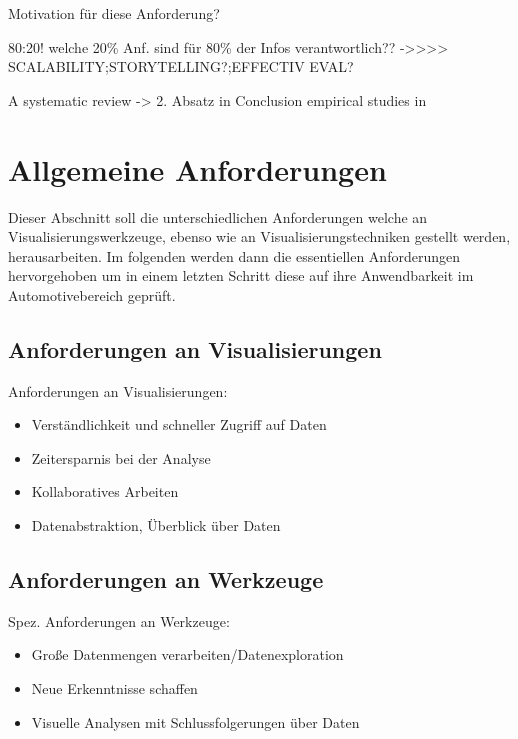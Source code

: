 \documentclass[draft=false
              ,paper=a4
              ,twoside=false
              ,fontsize=11pt
              ,headsepline
              ,BCOR10mm
              ,DIV11
              ]{scrbook}
\newcommand{\TODO}[1]{\colorbox{yellow}{\textcolor{red}{[TODO: #1]}}}
\begin{document}
Motivation für diese Anforderung?

80:20! welche 20\% Anf. sind für 80\% der Infos verantwortlich??\newline
->>>> SCALABILITY;STORYTELLING?;EFFECTIV EVAL?

A systematic review -> 2. Absatz in Conclusion \cite{isenberg_systematic_2013} \newline
empirical studies in \cite{lam_empirical_2012}
\fi
\section{Allgemeine Anforderungen} %
\label{sec:allgemeine_anforderungen}

Dieser Abschnitt soll die unterschiedlichen Anforderungen welche an Visualisierungswerkzeuge, ebenso wie an Visualisierungstechniken gestellt werden, herausarbeiten. Im folgenden werden dann die essentiellen Anforderungen hervorgehoben um in einem letzten Schritt diese auf ihre Anwendbarkeit im Automotivebereich geprüft.


\subsection{Anforderungen an Visualisierungen} %
\label{sub:anforderungen_an_visualisierungen}

Anforderungen an Visualisierungen:

\begin{itemize}
  \item Verständlichkeit und schneller Zugriff auf Daten
  \item Zeitersparnis bei der Analyse
  \item Kollaboratives Arbeiten
  \item Datenabstraktion, Überblick über Daten
\end{itemize}

\subsection{Anforderungen an Werkzeuge} %
\label{sub:anforderungen_an_werkzeuge}

Spez. Anforderungen an Werkzeuge:

\begin{itemize}
  \item Große Datenmengen verarbeiten/Datenexploration 
  \item Neue Erkenntnisse schaffen
  \item Visuelle Analysen mit Schlussfolgerungen über Daten
\end{itemize}

\end{document}
